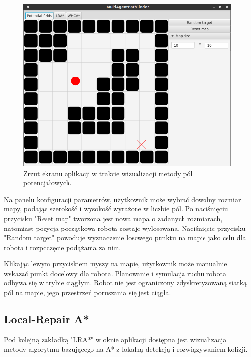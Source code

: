 \begin{figure}
	\centering
	\includegraphics[width=0.8\columnwidth]{img/robopath/ui-fields}
	\caption{Zrzut ekranu aplikacji w trakcie wizualizacji metody pól potencjałowych.}
	\label{fig:robopath-ui-fields}
\end{figure}

Na panelu konfiguracji parametrów, użytkownik może wybrać dowolny rozmiar mapy, podając szerokość i wysokość wyrażone w liczbie pól.
Po naciśnięciu przycisku "Reset map" tworzona jest nowa mapa o zadanych rozmiarach, natomiast pozycja początkowa robota zostaje wylosowana.
Naciśnięcie przycisku "Random target" powoduje wyznaczenie losowego punktu na mapie jako celu dla robota i rozpoczęcie podążania za nim.

Klikając lewym przyciskiem myszy na mapie, użytkownik może manualnie wskazać punkt docelowy dla robota.
Planowanie i symulacja ruchu robota odbywa się w trybie ciągłym. Robot nie jest ograniczony zdyskretyzowaną siatką pól na mapie, jego przestrzeń poruszania się jest ciągła.

\subsection{Local-Repair A*}
\label{ch:app-lra}
Pod kolejną zakładką "LRA*" w oknie aplikacji dostępna jest wizualizacja metody algorytmu bazującego na A* z lokalną detekcją i rozwiązywaniem kolizji.

